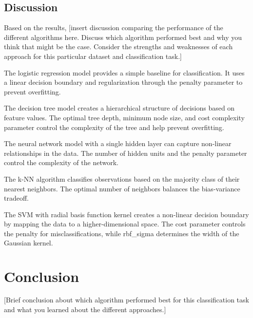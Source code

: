 \documentclass{article}
\begin{document}
\subsection{Discussion}

Based on the results, [insert discussion comparing the performance of the different algorithms here. Discuss which algorithm performed best and why you think that might be the case. Consider the strengths and weaknesses of each approach for this particular dataset and classification task.]

The logistic regression model provides a simple baseline for classification. It uses a linear decision boundary and regularization through the penalty parameter to prevent overfitting.

The decision tree model creates a hierarchical structure of decisions based on feature values. The optimal tree depth, minimum node size, and cost complexity parameter control the complexity of the tree and help prevent overfitting.

The neural network model with a single hidden layer can capture non-linear relationships in the data. The number of hidden units and the penalty parameter control the complexity of the network.

The k-NN algorithm classifies observations based on the majority class of their nearest neighbors. The optimal number of neighbors balances the bias-variance tradeoff.

The SVM with radial basis function kernel creates a non-linear decision boundary by mapping the data to a higher-dimensional space. The cost parameter controls the penalty for misclassifications, while rbf_sigma determines the width of the Gaussian kernel.

\section{Conclusion}

[Brief conclusion about which algorithm performed best for this classification task and what you learned about the different approaches.]
\end{document}
